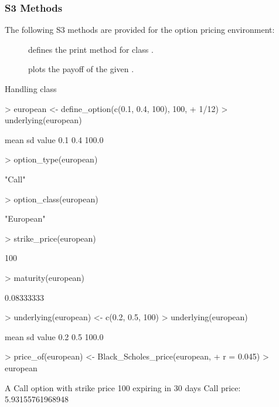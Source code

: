 \subsubsection{S3 Methods}

The following S3 methods are provided for the option pricing environment:

\begin{description}
\item[] defines the print method for class .
\item[] plots the payoff of the given .
\end{description}

\begin{Example} Handling class 
\label{ex:option}
\begin{Schunk}
\begin{Sinput}
> european <- define_option(c(0.1, 0.4, 100), 100, 
+     1/12)
> underlying(european)
\end{Sinput}
\begin{Soutput}
 mean    sd value 
  0.1   0.4 100.0 
\end{Soutput}
\begin{Sinput}
> option_type(european)
\end{Sinput}
\begin{Soutput}
[1] "Call"
\end{Soutput}
\begin{Sinput}
> option_class(european)
\end{Sinput}
\begin{Soutput}
[1] "European"
\end{Soutput}
\begin{Sinput}
> strike_price(european)
\end{Sinput}
\begin{Soutput}
[1] 100
\end{Soutput}
\begin{Sinput}
> maturity(european)
\end{Sinput}
\begin{Soutput}
[1] 0.08333333
\end{Soutput}
\begin{Sinput}
> underlying(european) <- c(0.2, 0.5, 100)
> underlying(european)
\end{Sinput}
\begin{Soutput}
 mean    sd value 
  0.2   0.5 100.0 
\end{Soutput}
\begin{Sinput}
> price_of(european) <- Black_Scholes_price(european, 
+     r = 0.045)
> european
\end{Sinput}
\begin{Soutput}
A Call option with strike price 100
expiring in 30 days
Call price:  5.93155761968948
\end{Soutput}
\end{Schunk}
\end{Example}

